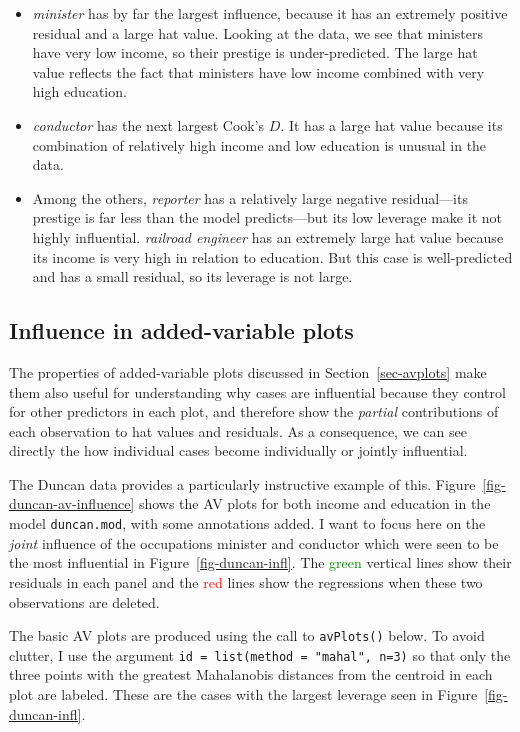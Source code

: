 \documentclass[
  letterpaper,
  10pt,
  krantz2]{krantz}
\begin{document}
{\begin{itemize}
\item
  \emph{minister} has by far the largest influence, because it has an
  extremely positive residual and a large hat value. Looking at the
  data, we see that ministers have very low income, so their prestige is
  under-predicted. The large hat value reflects the fact that ministers
  have low income combined with very high education.
\item
  \emph{conductor} has the next largest Cook's \(D\). It has a large hat
  value because its combination of relatively high income and low
  education is unusual in the data.
\item
  Among the others, \emph{reporter} has a relatively large negative
  residual---its prestige is far less than the model predicts---but its
  low leverage make it not highly influential. \emph{railroad engineer}
  has an extremely large hat value because its income is very high in
  relation to education. But this case is well-predicted and has a small
  residual, so its leverage is not large.
\end{itemize}

\subsection{Influence in added-variable
plots}\label{influence-in-added-variable-plots}

The properties of added-variable plots discussed in
Section~\ref{sec-avplots} make them also useful for understanding why
cases are influential because they control for other predictors in each
plot, and therefore show the \emph{partial} contributions of each
observation to hat values and residuals. As a consequence, we can see
directly the how individual cases become individually or jointly
influential.

The Duncan data provides a particularly instructive example of this.
Figure~\ref{fig-duncan-av-influence} shows the AV plots for both income
and education in the model \texttt{duncan.mod}, with some annotations
added. I want to focus here on the \emph{joint} influence of the
occupations minister and conductor which were seen to be the most
influential in Figure~\ref{fig-duncan-infl}. The
\textcolor{green}{green} vertical lines show their residuals in each
panel and the \textcolor{red}{red} lines show the regressions when these
two observations are deleted.

The basic AV plots are produced using the call to \texttt{avPlots()}
below. To avoid clutter, I use the argument
\texttt{id\ =\ list(method\ =\ "mahal",\ n=3)} so that only the three
points with the greatest Mahalanobis distances from the centroid in each
plot are labeled. These are the cases with the largest leverage seen in
Figure~\ref{fig-duncan-infl}.

}
\end{document}

